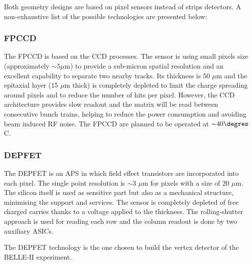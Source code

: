 
   Both geometry designs are based on  pixel sensors instead of strips detectors.
   A non-exhaustive list of the possible technologies are presented below:
    
   \subsubsection{FPCCD}
   
     The \gls{FPCCD} \cite{CalanchaParedes} is based on the \gls{CCD} processes.
     The sensor is using small pixels size (approximately $\sim 5 \mu\text{m}$) to provide a sub-micron spatial resolution and an excellent capability to separate two nearby tracks.
     Its thickness is 50 $\mu\text{m}$ and the epitaxial layer (15 $\mu\text{m}$ thick) is completely depleted to limit the charge spreading around pixels and to reduce the number of hits per pixel.
     However, the \gls{CCD} architecture provides slow readout and the matrix will be read between consecutive bunch trains, helping to reduce the power consumption and avoiding beam induced RF noise.
     The \gls{FPCCD} are planned to be operated at $-40 \degres$C.

   \subsubsection{DEPFET}
    
    The \gls{DEPFET} \cite{Richter2003} is an \gls{APS} in which field effect transistors are incorporated into each pixel.
    The single point resolution is $\sim 3$ $\mu\text{m}$ for pixels with a size of 20 $\mu\text{m}$.
    The silicon itself is used as sensitive part but also as a mechanical structure, minimising the support and services.
    The sensor is completely depleted of free charged carries thanks to a voltage applied to the thickness.
    The rolling-shutter approach is used for reading each row and the column readout is done by two auxiliary \glspl{ASIC}.

    The \gls{DEPFET} technology is the one chosen  to build the vertex detector of the BELLE-II experiment\cite{depfetBelleII}.

